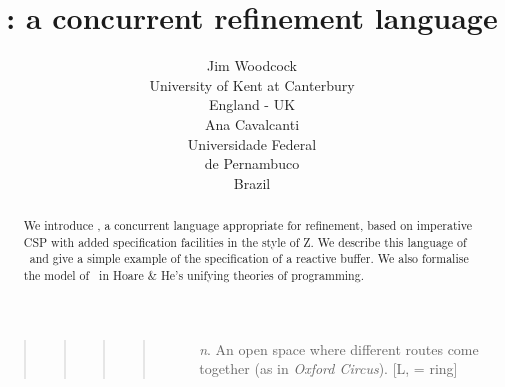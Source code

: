 \documentclass{article}
\begin{document}
\title{\Circus: a concurrent refinement language}

\author{ %
  \begin{tabular}[t]{c}
    Jim Woodcock
    \\ %
    University of Kent at Canterbury
    \\ %
    England - UK
  \end{tabular}
  \quad
  \begin{tabular}[t]{c}
    Ana Cavalcanti
    \\ %
    Universidade Federal
    \\ %
    de Pernambuco
    \\ %
    Brazil
  \end{tabular}
  } %

\bigskip

\maketitle

\bigskip

\begin{abstract}
  \noindent We introduce \Circus, a concurrent language appropriate for
  refinement, based on imperative CSP with added specification
  facilities in the style of Z.  We describe this language of \Circus\
  and give a simple example of the specification of a reactive buffer.
  We also formalise the model of \Circus\ in Hoare \& He's unifying
  theories of programming.
\end{abstract}

\bigskip \bigskip

\begin{quote}
  \begin{quote}
    \begin{quote}
      \begin{quote}
        \begin{description}
        \item[\Circus] \emph{n}.  An open space where different routes
          come together (as in \emph{Oxford Circus}). [L, = ring]
        \end{description}
      \end{quote}
    \end{quote}
  \end{quote}
\end{quote}

\newpage %

\tableofcontents

\newpage %
\end{document}
